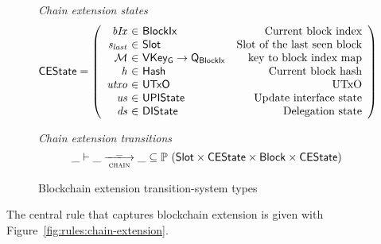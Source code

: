 \documentclass[11pt,a4paper]{article}
\newcommand{\powerset}[1]{\mathbb{P}~#1}
\newcommand{\var}[1]{\mathit{#1}}
\newcommand{\type}[1]{\mathsf{#1}}
\newcommand{\trans}[2]{\xlongrightarrow[\textsc{#1}]{#2}}
\newcommand{\totalf}{\to}
\newcommand{\Hash}{\type{Hash}}  %
\newcommand{\Slot}{\type{Slot}}
\newcommand{\BlockIx}{\type{BlockIx}}
\newcommand{\Block}{\type{Block}}
\newcommand{\Queue}{\type{Q}}
\newcommand{\VKeyGen}{\type{VKey_G}}
\newcommand{\signmapname}{\mathcal{M}}
\begin{document}
\begin{figure}[ht]
  \emph{Chain extension states}
  \begin{equation*}
    \CEState =
    \left(
      \begin{array}{r@{~\in~}lr}
        \var{bIx} & \BlockIx & \text{Current block index} \\
        \var{s_{last}} & \Slot & \text{Slot of the last seen block} \\
        \signmapname & \VKeyGen \totalf \Queue_\BlockIx & \text{key to block index map} \\
        \var{h} & \Hash & \text{Current block hash} \\
        \var{utxo} & \UTxO & \text{UTxO} \\
        \var{us} & \UPIState & \text{Update interface state} \\
        \var{ds} & \DIState & \text{Delegation state}
      \end{array}
    \right)
  \end{equation*}

  \emph{Chain extension transitions}
  \begin{equation*}
    \_ \vdash \var{\_} \trans{chain}{\_} \var{\_} \subseteq
    \powerset (\Slot \times \CEState \times \Block \times \CEState)
  \end{equation*}

  \caption{Blockchain extension transition-system types}
  \label{fig:ts-types:chain-extension}
\end{figure}

The central rule that captures blockchain extension is given with
Figure~\ref{fig:rules:chain-extension}.
\end{document}
